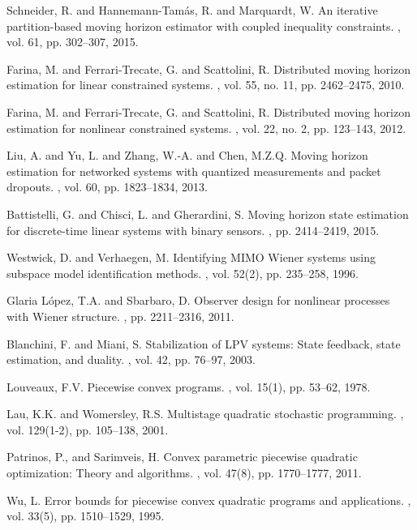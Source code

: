 \documentclass[11pt,journal,onecolumn]{IEEEtran}
\begin{document}
\begin{thebibliography}{10}
Schneider, R. and Hannemann-Tamás, R. and Marquardt, W.
\newblock An iterative partition-based moving horizon estimator with coupled inequality constraints.
,  vol. 61, pp. 302--307, 2015.

Farina, M. and {Ferrari-Trecate}, G. and Scattolini, R.
\newblock Distributed moving horizon estimation for linear constrained systems.
,  vol. 55, no. 11, pp. 2462--2475, 2010.

Farina, M. and {Ferrari-Trecate}, G. and Scattolini, R.
\newblock Distributed moving horizon estimation for nonlinear constrained systems.
,  vol. 22, no. 2, pp. 123--143, 2012.

Liu, A. and Yu, L. and Zhang, W.-A. and Chen, M.Z.Q.
\newblock Moving horizon estimation for networked systems with quantized measurements and packet dropouts.
,  vol. 60, pp. 1823--1834, 2013.

Battistelli, G. and Chisci, L. and Gherardini, S.
\newblock Moving horizon state estimation for discrete-time linear systems with binary sensors.
, pp. 2414--2419, 2015.

Westwick, D. and Verhaegen, M.
\newblock Identifying {MIMO} {Wiener} systems using subspace model identification methods.
, vol. 52(2), pp. 235--258, 1996.

Glaria L\'opez, T.A. and Sbarbaro, D.
\newblock Observer design for nonlinear processes with {Wiener} structure.
, pp. 2211--2316, 2011.

Blanchini, F. and Miani, S.
\newblock Stabilization of {LPV} systems: State feedback, state estimation, and duality.
,  vol. 42, pp. 76--97, 2003.

Louveaux, F.V.
\newblock Piecewise convex programs.
, vol. 15(1), pp. 53--62, 1978.

Lau, K.K. and Womersley, R.S.
\newblock Multistage quadratic stochastic programming.
, vol. 129(1-2), pp. 105--138, 2001.

Patrinos, P., and Sarimveis, H.
\newblock Convex parametric piecewise quadratic optimization: Theory and algorithms.
, vol. 47(8), pp. 1770--1777, 2011.

Wu, L.
\newblock Error bounds for piecewise convex quadratic programs and applications.
, vol. 33(5), pp. 1510--1529, 1995.

\end{thebibliography}
\end{document}
